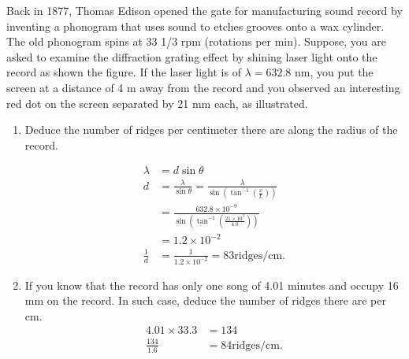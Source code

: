 \documentclass{zc-ust-hw}
\begin{document}
\maketitle

Back in 1877, Thomas Edison opened the gate for manufacturing sound record by
inventing a phonogram that uses sound to etches grooves onto a wax cylinder.
The old phonogram spins at 33 1/3 rpm (rotations per min). Suppose, you are
asked to examine the diffraction grating effect by shining laser light onto the
record as shown the figure. If the laser light is of \(\lambda = 632.8\) nm, you put the
screen at a distance of 4 m away from the record and you observed an
interesting red dot on the screen separated by 21 mm each, as illustrated.

\begin{enumerate}
  \item Deduce the number of ridges per centimeter there are along the radius
    of the record.

      \begin{align}
        \lambda &= d\sin \theta  \\
        d &= \frac{\lambda}{\sin \theta } = \frac{\lambda}{\sin \left( \tan ^{-1} \left( \frac{x}{L} \right) \right)  } \\
        &= \frac{632.8\times 10^{-9}}{\sin \left( \tan ^{-1} \left(  \frac{21\times 10^{3} }{4.0} \right)  \right) }  \\
        &= 1.2\times 10^{-2}  \\
        \frac{1}{d} &= \frac{1}{1.2\times 10^{-2} } = 83 \text{ridges/cm}
      .\end{align}

  \item If you know that the record has only one song of 4.01 minutes and occupy
    16 mm on the record. In such case, deduce the number of ridges there are per
    cm.
    \begin{align}
      4.01 \times 33.3 &= 134 \\
      \frac{134}{1.6} &= 84 \text{ridges/cm}
    .\end{align}
\end{enumerate}
\end{document}
